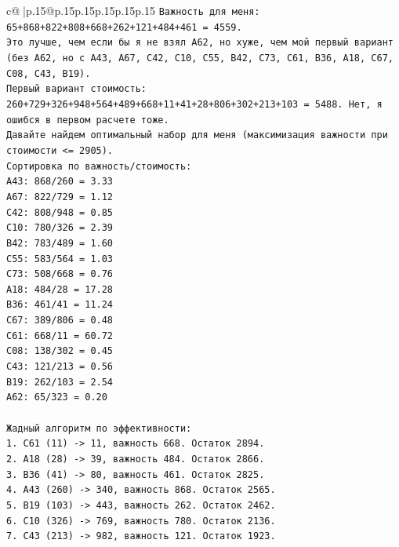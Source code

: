 \documentclass{article}
\begin{document}
{\begin{supertabular}{c@{$\;$}|p{.15\linewidth}@{}p{.15\linewidth}p{.15\linewidth}p{.15\linewidth}p{.15\linewidth}p{.15\linewidth}}
{{{\texttt{Важность для меня: 65+868+822+808+668+262+121+484+461 = 4559.} \\
\texttt{Это лучше, чем если бы я не взял A62, но хуже, чем мой первый вариант (без A62, но с A43, A67, C42, C10, C55, B42, C73, C61, B36, A18, C67, C08, C43, B19).} \\
\texttt{Первый вариант стоимость: 260+729+326+948+564+489+668+11+41+28+806+302+213+103 = 5488. Нет, я ошибся в первом расчете тоже.} \\
\texttt{Давайте найдем оптимальный набор для меня (максимизация важности при стоимости <= 2905).} \\
\texttt{Сортировка по важность/стоимость:} \\
\texttt{A43: 868/260 = 3.33} \\
\texttt{A67: 822/729 = 1.12} \\
\texttt{C42: 808/948 = 0.85} \\
\texttt{C10: 780/326 = 2.39} \\
\texttt{B42: 783/489 = 1.60} \\
\texttt{C55: 583/564 = 1.03} \\
\texttt{C73: 508/668 = 0.76} \\
\texttt{A18: 484/28 = 17.28} \\
\texttt{B36: 461/41 = 11.24} \\
\texttt{C67: 389/806 = 0.48} \\
\texttt{C61: 668/11 = 60.72} \\
\texttt{C08: 138/302 = 0.45} \\
\texttt{C43: 121/213 = 0.56} \\
\texttt{B19: 262/103 = 2.54} \\
\texttt{A62: 65/323 = 0.20} \\
\\ 
\texttt{Жадный алгоритм по эффективности:} \\
\texttt{1. C61 (11) {-}> 11, важность 668. Остаток 2894.} \\
\texttt{2. A18 (28) {-}> 39, важность 484. Остаток 2866.} \\
\texttt{3. B36 (41) {-}> 80, важность 461. Остаток 2825.} \\
\texttt{4. A43 (260) {-}> 340, важность 868. Остаток 2565.} \\
\texttt{5. B19 (103) {-}> 443, важность 262. Остаток 2462.} \\
\texttt{6. C10 (326) {-}> 769, важность 780. Остаток 2136.} \\
\texttt{7. C43 (213) {-}> 982, важность 121. Остаток 1923.} \\
}}}
\end{supertabular}}
\end{document}
